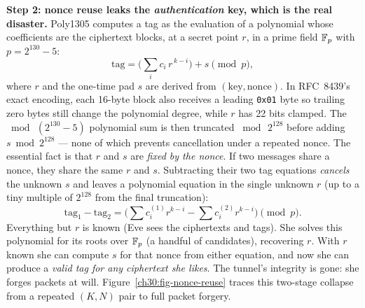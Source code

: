 \textbf{Step 2: nonce reuse leaks the \emph{authentication} key, which is the real disaster.} Poly1305 computes a tag as the evaluation of a polynomial whose coefficients are the ciphertext blocks, at a secret point \(r\), in a prime field \(\mathbb{F}_p\) with \(p = 2^{130}-5\):
\[
\mathrm{tag} = \Big(\sum_{i} c_i\, r^{\,k-i} \Big) + s \pmod p,
\]
where \(r\) and the one-time pad \(s\) are derived from \((\text{key},\text{nonce})\). In RFC~8439's exact encoding, each 16-byte block also receives a leading \texttt{0x01} byte so trailing zero bytes still change the polynomial degree, while \(r\) has 22 bits clamped. The \(\bmod\,(2^{130}-5)\) polynomial sum is then truncated \(\bmod\,2^{128}\) before adding \(s \bmod 2^{128}\) --- none of which prevents cancellation under a repeated nonce. The essential fact is that \(r\) and \(s\) are \emph{fixed by the nonce}. If two messages share a nonce, they share the same \(r\) and \(s\). Subtracting their two tag equations \emph{cancels} the unknown \(s\) and leaves a polynomial equation in the single unknown \(r\) (up to a tiny multiple of \(2^{128}\) from the final truncation):
\[
\mathrm{tag}_1 - \mathrm{tag}_2 = \Big(\textstyle\sum c^{(1)}_i r^{k-i} - \sum c^{(2)}_i r^{k-i}\Big) \pmod p .
\]
Everything but \(r\) is known (Eve sees the ciphertexts and tags). She solves this polynomial for its roots over \(\mathbb{F}_p\) (a handful of candidates), recovering \(r\). With \(r\) known she can compute \(s\) for that nonce from either equation, and now she can produce a \emph{valid tag for any ciphertext she likes}. The tunnel's integrity is gone: she forges packets at will. Figure~\ref{ch30:fig-nonce-reuse} traces this two-stage collapse from a repeated \((K, N)\) pair to full packet forgery.

